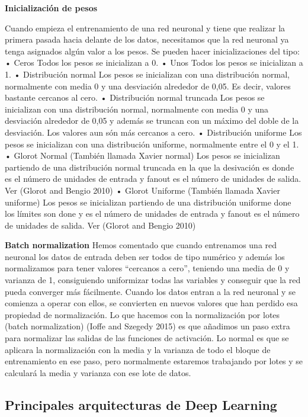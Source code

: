 \documentclass[
  a4paper,
  DIV=11,
  numbers=noendperiod]{scrreprt}
\begin{document}
\textbf{Inicialización de pesos}

Cuando empieza el entrenamiento de una red neuronal y tiene que realizar
la primera pasada hacia delante de los datos, necesitamos que la red
neuronal ya tenga asignados algún valor a los pesos. Se pueden hacer
inicializaciones del tipo: • Ceros Todos los pesos se inicializan a 0. •
Unos Todos los pesos se inicializan a 1. • Distribución normal Los pesos
se inicializan con una distribución normal, normalmente con media 0 y
una desviación alrededor de 0,05. Es decir, valores bastante cercanos al
cero. • Distribución normal truncada Los pesos se inicializan con una
distribución normal, normalmente con media 0 y una desviación alrededor
de 0,05 y además se truncan con un máximo del doble de la desviación.
Los valores aun són más cercanos a cero. • Distribución uniforme Los
pesos se inicializan con una distribución uniforme, normalmente entre el
0 y el 1. • Glorot Normal (También llamada Xavier normal) Los pesos se
inicializan partiendo de una distribución normal truncada en la que la
desivación es donde es el número de unidades de entrada y fanout es el
número de unidades de salida. Ver (Glorot and Bengio 2010) • Glorot
Uniforme (También llamada Xavier uniforme) Los pesos se inicializan
partiendo de una distribución uniforme done los límites son done y es el
número de unidades de entrada y fanout es el número de unidades de
salida. Ver (Glorot and Bengio 2010)

\textbf{Batch normalization} Hemos comentado que cuando entrenamos una
red neuronal los datos de entrada deben ser todos de tipo numérico y
además los normalizamos para tener valores ``cercanos a cero'', teniendo
una media de 0 y varianza de 1, consiguiendo uniformizar todas las
variables y conseguir que la red pueda converger más fácilmente. Cuando
los datos entran a la red neuronal y se comienza a operar con ellos, se
convierten en nuevos valores que han perdido esa propiedad de
normalización. Lo que hacemos con la normalización por lotes (batch
normalization) (Ioffe and Szegedy 2015) es que añadimos un paso extra
para normalizar las salidas de las funciones de activación. Lo normal es
que se aplicara la normalización con la media y la varianza de todo el
bloque de entrenamiento en ese paso, pero normalmente estaremos
trabajando por lotes y se calculará la media y varianza con ese lote de
datos.

\hypertarget{principales-arquitecturas-de-deep-learning}{%
\subsection{Principales arquitecturas de Deep
Learning}\label{principales-arquitecturas-de-deep-learning}}
\end{document}
